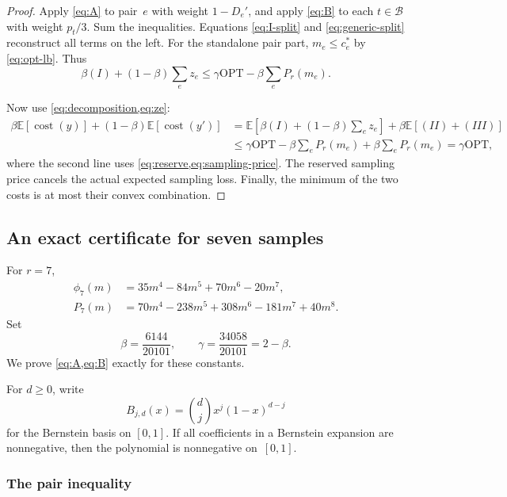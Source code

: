 \documentclass[11pt,letterpaper]{article}
\theoremstyle{definition}
\theoremstyle{remark}
\newcommand{\OPT}{\mathrm{OPT}}
\newcommand{\cost}{\operatorname{cost}}
\newcommand{\E}{\mathbb{E}}
\newcommand{\1}{\mathbf{1}}
\newcommand{\calB}{\mathcal{B}}
\begin{document}
\begin{proof}
Apply \cref{eq:A} to pair~$e$ with weight $1-D_e'$, and apply \cref{eq:B} to each $t\in\calB$ with weight $p_t/3$.  Sum the inequalities.  Equations \eqref{eq:I-split} and \eqref{eq:generic-split} reconstruct all terms on the left.  For the standalone pair part, $m_e\le c_e^*$ by \cref{eq:opt-lb}.  Thus
\begin{equation}\label{eq:reserve}
 \beta(I)+(1-\beta)\sum_ez_e
 \le\gamma\OPT-\beta\sum_eP_r(m_e).
\end{equation}

Now use \cref{eq:decomposition,eq:ze}:
\begin{align*}
 \beta\E[\cost(y)]+(1-\beta)\E[\cost(y')]
 &= \E\left[\beta(I)+(1-\beta)\sum_ez_e\right]
      +\beta\E[(II)+(III)]\\
 &\le \gamma\OPT-\beta\sum_eP_r(m_e)
      +\beta\sum_eP_r(m_e)
 =\gamma\OPT,
\end{align*}
where the second line uses \cref{eq:reserve,eq:sampling-price}.  The reserved sampling price cancels the actual expected sampling loss.  Finally, the minimum of the two costs is at most their convex combination.
\end{proof}

\subsection{An exact certificate for seven samples}\label{sec:certificate}

For $r=7$,
\begin{align}
 \phi_7(m)&=35m^4-84m^5+70m^6-20m^7,
 \label{eq:phi7}\\
 P_7(m)&=70m^4-238m^5+308m^6-181m^7+40m^8.
 \label{eq:P7}
\end{align}
Set
\begin{equation}\label{eq:constants}
 \beta=\frac{6144}{20101},
 \qquad
 \gamma=\frac{34058}{20101}=2-\beta.
\end{equation}
We prove \cref{eq:A,eq:B} exactly for these constants.

For $d\ge0$, write
\[
 B_{j,d}(x)=\binom djx^j(1-x)^{d-j}
\]
for the Bernstein basis on $[0,1]$.  If all coefficients in a Bernstein expansion are nonnegative, then the polynomial is nonnegative on~$[0,1]$.

\subsubsection{The pair inequality}
\end{document}
